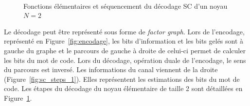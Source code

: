 \begin{figure}[t]
  \centering
  \quad\quad
  \quad\quad
  \\
  \quad\quad
  \quad\quad
  \caption{Fonctions élémentaires et séquencement du décodage SC d'un noyau $N=2$}
  \label{fig:sc_steps}
\end{figure}


Le décodage peut être représenté sous forme de \textit{factor graph}. Lors de l'encodage, représenté en Figure~\ref{fig:encodage}, les bits d'information et les bits gelés sont à gauche du graphe et le parcours de gauche à droite de celui-ci permet de calculer les bits du mot de code. Lors du décodage, opération duale de l'encodage, le sens du parcours est inversé. Les informations du canal viennent de la droite (Figure~\ref{fig:sc_steps_1}). Elles représentent les estimations des bits du mot de code. 
Les étapes du décodage du noyau élémentaire de taille 2 sont détaillées en Figure~\ref{fig:sc_steps}.

